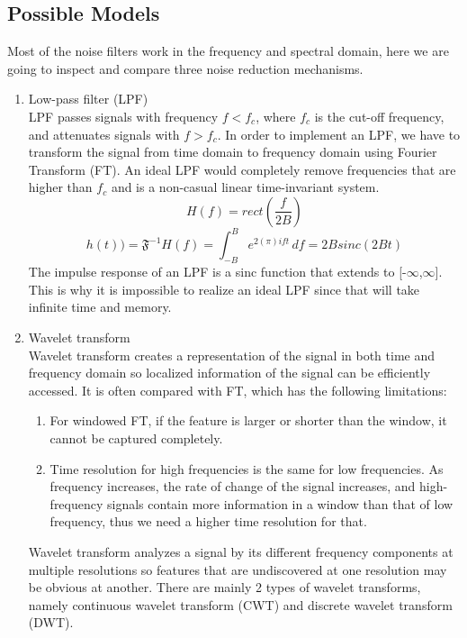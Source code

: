 \subsection{Possible Models}
Most of the noise filters work in the frequency and spectral domain, here we are going to inspect and
compare three noise reduction mechanisms.

\begin{enumerate}
    \item Low-pass filter (LPF)\\
    LPF passes signals with frequency \(f<f_{c}\), where \(f_{c}\) is the cut-off frequency, and attenuates
    signals with \(f>f_{c}\). 
    In order to implement an LPF, we have to transform the signal from time domain to 
    frequency domain using Fourier Transform (FT). An ideal LPF would completely remove frequencies that are
    higher than \(f_{c}\) and is a non-casual linear time-invariant system. 
    \[H(f) = rect(\frac{f}{2B})\]
    \[h(t))= \mathfrak{F}^{-1}{H(f)} = \int_{-B}^{B} e^{2(\pi)ift}\,df = 2Bsinc(2Bt)\]
    The impulse response of an LPF is a sinc function that extends to [-$\infty$,$\infty$]. This is why it is 
    impossible to realize an ideal LPF since that will take infinite time and memory.

    \item Wavelet transform\\
    Wavelet transform creates a representation of the signal in both time and frequency domain so localized 
    information of the signal can be efficiently accessed. It is often compared with FT, which
    has the following limitations: 
    \begin{enumerate}
        \item For windowed FT, if the feature is larger or shorter than the window, it cannot be captured completely.
        \item Time resolution for high frequencies is the same for low frequencies. As frequency increases, the rate of 
        change of the signal increases, and high-frequency signals contain more information in a window than that of 
        low frequency, thus we need a higher time resolution for that.
    \end{enumerate}
    Wavelet transform analyzes a signal by its different frequency components at multiple resolutions so features that are 
    undiscovered at one resolution may be obvious at another. There are mainly 2 types of wavelet transforms, namely 
    continuous wavelet transform (CWT) and discrete wavelet transform (DWT).
    

\end{enumerate}
